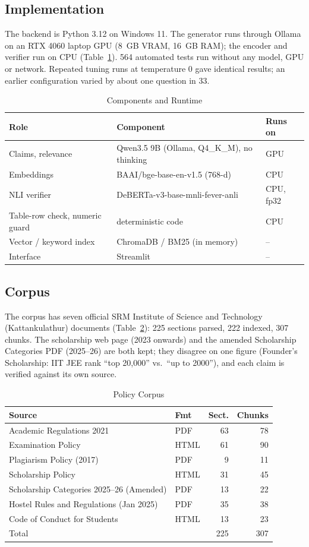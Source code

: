 \documentclass[conference]{IEEEtran}
\begin{document}
\subsection{Implementation}
The backend is Python 3.12 on Windows 11. The generator runs through Ollama on an RTX 4060 laptop GPU
(8~GB VRAM, 16~GB RAM); the encoder and verifier run on CPU (Table~\ref{tab:components}). 564 automated
tests run without any model, GPU or network. Repeated tuning runs at temperature 0 gave identical results;
an earlier configuration varied by about one question in 33.

\begin{table}[t]
\caption{Components and Runtime}
\label{tab:components}
\centering\scriptsize
\begin{tabular}{@{}lll@{}}
\toprule
Role & Component & Runs on\\
\midrule
Claims, relevance & Qwen3.5 9B (Ollama, Q4\_K\_M), no thinking & GPU\\
Embeddings & BAAI/bge-base-en-v1.5 (768-d) & CPU\\
NLI verifier & DeBERTa-v3-base-mnli-fever-anli & CPU, fp32\\
Table-row check, numeric guard & deterministic code & CPU\\
Vector / keyword index & ChromaDB / BM25 (in memory) & --\\
Interface & Streamlit & --\\
\bottomrule
\end{tabular}
\end{table}

\subsection{Corpus}
The corpus has seven official SRM Institute of Science and Technology (Kattankulathur) documents
(Table~\ref{tab:corpus}): 225 sections parsed, 222 indexed, 307 chunks. The scholarship web page (2023
onwards) and the amended Scholarship Categories PDF (2025--26) are both kept; they disagree on one figure
(Founder's Scholarship: IIT JEE rank ``top 20,000'' vs.\ ``up to 2000''), and each claim is verified against
its own source.

\begin{table}[t]
\caption{Policy Corpus}
\label{tab:corpus}
\centering\scriptsize
\begin{tabular}{@{}llrr@{}}
\toprule
Source & Fmt & Sect. & Chunks\\
\midrule
Academic Regulations 2021 & PDF & 63 & 78\\
Examination Policy & HTML & 61 & 90\\
Plagiarism Policy (2017) & PDF & 9 & 11\\
Scholarship Policy & HTML & 31 & 45\\
Scholarship Categories 2025--26 (Amended) & PDF & 13 & 22\\
Hostel Rules and Regulations (Jan 2025) & PDF & 35 & 38\\
Code of Conduct for Students & HTML & 13 & 23\\
\midrule
Total & & 225 & 307\\
\bottomrule
\end{tabular}
\end{table}
\end{document}
